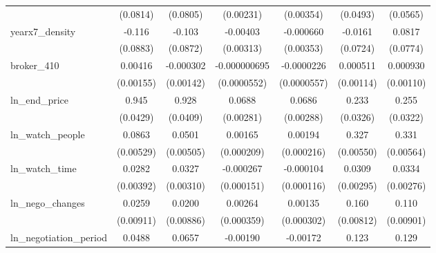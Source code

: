 {\begin{tabular}{l*{6}{c}}
            &    (0.0814)         &    (0.0805)         &   (0.00231)         &   (0.00354)         &    (0.0493)         &    (0.0565)         \\
\addlinespace
yearx7\_density&      -0.116         &      -0.103         &    -0.00403         &   -0.000660         &     -0.0161         &      0.0817         \\
            &    (0.0883)         &    (0.0872)         &   (0.00313)         &   (0.00353)         &    (0.0724)         &    (0.0774)         \\
\addlinespace
broker\_410  &     0.00416\sym{***}&   -0.000302         &-0.000000695         &  -0.0000226         &    0.000511         &    0.000930         \\
            &   (0.00155)         &   (0.00142)         & (0.0000552)         & (0.0000557)         &   (0.00114)         &   (0.00110)         \\
\addlinespace
ln\_end\_price&       0.945\sym{***}&       0.928\sym{***}&      0.0688\sym{***}&      0.0686\sym{***}&       0.233\sym{***}&       0.255\sym{***}\\
            &    (0.0429)         &    (0.0409)         &   (0.00281)         &   (0.00288)         &    (0.0326)         &    (0.0322)         \\
\addlinespace
ln\_watch\_people&      0.0863\sym{***}&      0.0501\sym{***}&     0.00165\sym{***}&     0.00194\sym{***}&       0.327\sym{***}&       0.331\sym{***}\\
            &   (0.00529)         &   (0.00505)         &  (0.000209)         &  (0.000216)         &   (0.00550)         &   (0.00564)         \\
\addlinespace
ln\_watch\_time&      0.0282\sym{***}&      0.0327\sym{***}&   -0.000267\sym{*}  &   -0.000104         &      0.0309\sym{***}&      0.0334\sym{***}\\
            &   (0.00392)         &   (0.00310)         &  (0.000151)         &  (0.000116)         &   (0.00295)         &   (0.00276)         \\
\addlinespace
ln\_nego\_changes&      0.0259\sym{***}&      0.0200\sym{**} &     0.00264\sym{***}&     0.00135\sym{***}&       0.160\sym{***}&       0.110\sym{***}\\
            &   (0.00911)         &   (0.00886)         &  (0.000359)         &  (0.000302)         &   (0.00812)         &   (0.00901)         \\
\addlinespace
ln\_negotiation\_period&      0.0488\sym{***}&      0.0657\sym{***}&    -0.00190\sym{***}&    -0.00172\sym{***}&       0.123\sym{***}&       0.129\sym{***}\\

\end{tabular}}
